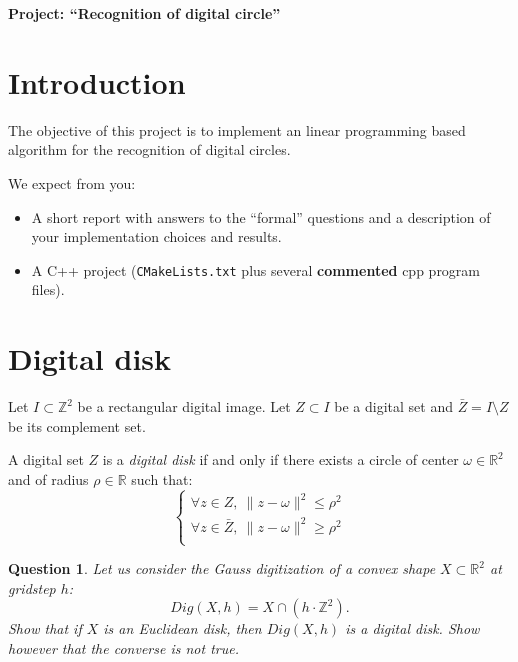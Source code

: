 \documentclass[a4paper, 11pt]{article}
\title{}
\author{}
\date{}
\newtheorem{qu}{Question}
\begin{document}
\begin{center}
	\LARGE \textbf{Project: ``Recognition of digital circle''}
\end{center}

\section*{Introduction}

The objective of this project is to implement an linear programming based algorithm
for the recognition of digital circles. 

We expect from you:
\begin{itemize}
\item A short report with answers to the ``formal'' questions and a
  description of your implementation choices and results.
\item A C++ project (\texttt{CMakeLists.txt} plus several
  \textbf{commented} cpp program files).
\end{itemize}


\section{Digital disk}

Let $I \subset \mathbb{Z}^2$ be a rectangular digital image. Let $Z \subset I$ be 
a digital set and $\bar{Z} = I \setminus Z$ be its complement set.

A digital set $Z$ is a \emph{digital disk} if and only if there exists a circle of 
center $\omega \in \mathbb{R}^2$ and of radius $\rho \in \mathbb{R}$ such that:  
\begin{equation}
  \left\{
  \begin{array}{l}
    \forall z \in Z, \: \| z - \omega \|^2 \leq \rho^2 \\
    \forall z \in \bar{Z}, \: \|  z - \omega \|^2 \geq \rho^2 \\
  \end{array}
  \right.
\end{equation}

\begin{qu}
Let us consider the Gauss digitization of a convex shape $X \subset \mathbb{R}^2$ at gridstep $h$:
\begin{displaymath}
  Dig(X,h) = X\cap (h\cdot \mathbb{Z}^2).
\end{displaymath}
Show that if $X$ is an Euclidean disk, then $Dig(X,h)$ is a digital disk. Show however that 
the converse is not true. 
\end{qu}
\end{document}
